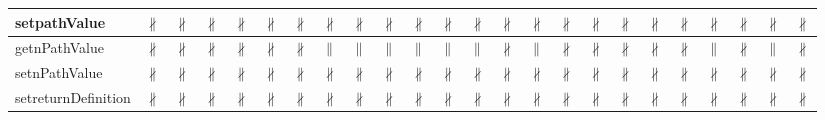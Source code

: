 \documentclass[10pt]{article}
\begin{document}
\begin{longtable}{|l|l|l|l|l|l|l|l|l|l|l|l|l|l|l|l|l|l|l|l|l|l|l|l|}
\hline
setpathValue&{\color{BrickRed}$\nparallel$}&{\color{BrickRed}$\nparallel$}&{\color{BrickRed}$\nparallel$}&{\color{BrickRed}$\nparallel$}&{\color{BrickRed}$\nparallel$}&{\color{BrickRed}$\nparallel$}&{\color{BrickRed}$\nparallel$}&{\color{BrickRed}$\nparallel$}&{\color{BrickRed}$\nparallel$}&{\color{BrickRed}$\nparallel$}&{\color{BrickRed}$\nparallel$}&{\color{BrickRed}$\nparallel$}&{\color{BrickRed}$\nparallel$}&{\color{BrickRed}$\nparallel$}&{\color{BrickRed}$\nparallel$}&{\color{BrickRed}$\nparallel$}&{\color{BrickRed}$\nparallel$}&{\color{BrickRed}$\nparallel$}&{\color{BrickRed}$\nparallel$}&{\color{BrickRed}$\nparallel$}&{\color{BrickRed}$\nparallel$}&{\color{BrickRed}$\nparallel$}&{\color{BrickRed}$\nparallel$}\\
\hline
getnPathValue&{\color{BrickRed}$\nparallel$}&{\color{BrickRed}$\nparallel$}&{\color{BrickRed}$\nparallel$}&{\color{BrickRed}$\nparallel$}&{\color{BrickRed}$\nparallel$}&{\color{BrickRed}$\nparallel$}&{\color{blue}$\parallel$}&{\color{blue}$\parallel$}&{\color{blue}$\parallel$}&{\color{blue}$\parallel$}&{\color{blue}$\parallel$}&{\color{blue}$\parallel$}&{\color{BrickRed}$\nparallel$}&{\color{blue}$\parallel$}&{\color{BrickRed}$\nparallel$}&{\color{BrickRed}$\nparallel$}&{\color{BrickRed}$\nparallel$}&{\color{BrickRed}$\nparallel$}&{\color{BrickRed}$\nparallel$}&{\color{blue}$\parallel$}&{\color{BrickRed}$\nparallel$}&{\color{blue}$\parallel$}&{\color{BrickRed}$\nparallel$}\\
\hline
setnPathValue&{\color{BrickRed}$\nparallel$}&{\color{BrickRed}$\nparallel$}&{\color{BrickRed}$\nparallel$}&{\color{BrickRed}$\nparallel$}&{\color{BrickRed}$\nparallel$}&{\color{BrickRed}$\nparallel$}&{\color{BrickRed}$\nparallel$}&{\color{BrickRed}$\nparallel$}&{\color{BrickRed}$\nparallel$}&{\color{BrickRed}$\nparallel$}&{\color{BrickRed}$\nparallel$}&{\color{BrickRed}$\nparallel$}&{\color{BrickRed}$\nparallel$}&{\color{BrickRed}$\nparallel$}&{\color{BrickRed}$\nparallel$}&{\color{BrickRed}$\nparallel$}&{\color{BrickRed}$\nparallel$}&{\color{BrickRed}$\nparallel$}&{\color{BrickRed}$\nparallel$}&{\color{BrickRed}$\nparallel$}&{\color{BrickRed}$\nparallel$}&{\color{BrickRed}$\nparallel$}&{\color{BrickRed}$\nparallel$}\\
\hline
setreturnDefinition&{\color{BrickRed}$\nparallel$}&{\color{BrickRed}$\nparallel$}&{\color{BrickRed}$\nparallel$}&{\color{BrickRed}$\nparallel$}&{\color{BrickRed}$\nparallel$}&{\color{BrickRed}$\nparallel$}&{\color{BrickRed}$\nparallel$}&{\color{BrickRed}$\nparallel$}&{\color{BrickRed}$\nparallel$}&{\color{BrickRed}$\nparallel$}&{\color{BrickRed}$\nparallel$}&{\color{BrickRed}$\nparallel$}&{\color{BrickRed}$\nparallel$}&{\color{BrickRed}$\nparallel$}&{\color{BrickRed}$\nparallel$}&{\color{BrickRed}$\nparallel$}&{\color{BrickRed}$\nparallel$}&{\color{BrickRed}$\nparallel$}&{\color{BrickRed}$\nparallel$}&{\color{BrickRed}$\nparallel$}&{\color{BrickRed}$\nparallel$}&{\color{BrickRed}$\nparallel$}&{\color{BrickRed}$\nparallel$}\\

\end{longtable}
\end{document}

